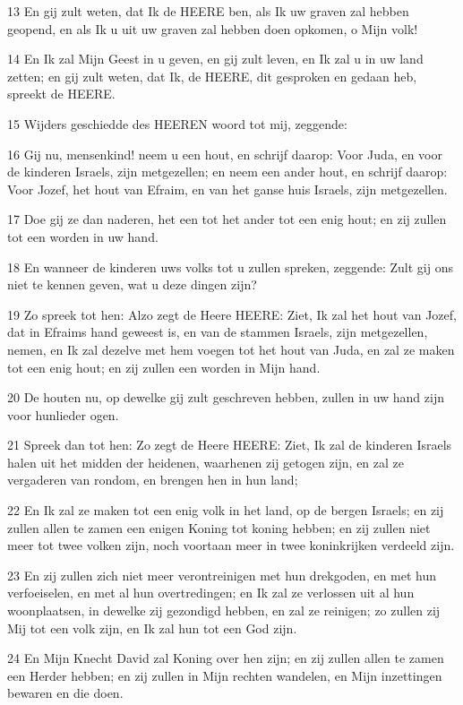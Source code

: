 \par 13 En gij zult weten, dat Ik de HEERE ben, als Ik uw graven zal hebben geopend, en als Ik u uit uw graven zal hebben doen opkomen, o Mijn volk!
\par 14 En Ik zal Mijn Geest in u geven, en gij zult leven, en Ik zal u in uw land zetten; en gij zult weten, dat Ik, de HEERE, dit gesproken en gedaan heb, spreekt de HEERE.
\par 15 Wijders geschiedde des HEEREN woord tot mij, zeggende:
\par 16 Gij nu, mensenkind! neem u een hout, en schrijf daarop: Voor Juda, en voor de kinderen Israels, zijn metgezellen; en neem een ander hout, en schrijf daarop: Voor Jozef, het hout van Efraim, en van het ganse huis Israels, zijn metgezellen.
\par 17 Doe gij ze dan naderen, het een tot het ander tot een enig hout; en zij zullen tot een worden in uw hand.
\par 18 En wanneer de kinderen uws volks tot u zullen spreken, zeggende: Zult gij ons niet te kennen geven, wat u deze dingen zijn?
\par 19 Zo spreek tot hen: Alzo zegt de Heere HEERE: Ziet, Ik zal het hout van Jozef, dat in Efraims hand geweest is, en van de stammen Israels, zijn metgezellen, nemen, en Ik zal dezelve met hem voegen tot het hout van Juda, en zal ze maken tot een enig hout; en zij zullen een worden in Mijn hand.
\par 20 De houten nu, op dewelke gij zult geschreven hebben, zullen in uw hand zijn voor hunlieder ogen.
\par 21 Spreek dan tot hen: Zo zegt de Heere HEERE: Ziet, Ik zal de kinderen Israels halen uit het midden der heidenen, waarhenen zij getogen zijn, en zal ze vergaderen van rondom, en brengen hen in hun land;
\par 22 En Ik zal ze maken tot een enig volk in het land, op de bergen Israels; en zij zullen allen te zamen een enigen Koning tot koning hebben; en zij zullen niet meer tot twee volken zijn, noch voortaan meer in twee koninkrijken verdeeld zijn.
\par 23 En zij zullen zich niet meer verontreinigen met hun drekgoden, en met hun verfoeiselen, en met al hun overtredingen; en Ik zal ze verlossen uit al hun woonplaatsen, in dewelke zij gezondigd hebben, en zal ze reinigen; zo zullen zij Mij tot een volk zijn, en Ik zal hun tot een God zijn.
\par 24 En Mijn Knecht David zal Koning over hen zijn; en zij zullen allen te zamen een Herder hebben; en zij zullen in Mijn rechten wandelen, en Mijn inzettingen bewaren en die doen.
